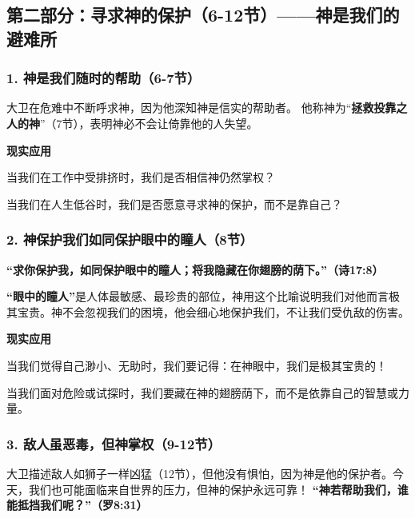\documentclass[a4paper, 12pt]{article}
\begin{document}
\subsection*{第二部分：寻求神的保护（6-12节）——神是我们的避难所  }

\subsubsection*{1. 神是我们随时的帮助（6-7节）  }
\hspace{0.6cm}大卫在危难中不断呼求神，因为他深知神是信实的帮助者。 他称神为“\textbf{拯救投靠之人的神}”（7节），表明神必不会让倚靠他的人失望。

\vspace{0.2cm}


\textbf{现实应用}

\hspace{0.6cm}当我们在工作中受排挤时，我们是否相信神仍然掌权？  

\hspace{0.6cm}当我们在人生低谷时，我们是否愿意寻求神的保护，而不是靠自己？  

\subsubsection*{2. 神保护我们如同保护眼中的瞳人（8节）}
  
\textbf{“求你保护我，如同保护眼中的瞳人；将我隐藏在你翅膀的荫下。”（诗17:8）}

\textbf{“眼中的瞳人”}是人体最敏感、最珍贵的部位，神用这个比喻说明我们对他而言极其宝贵。神不会忽视我们的困境，他会细心地保护我们，不让我们受仇敌的伤害。  
\vspace{0.2cm}

\textbf{现实应用}

\hspace{0.6cm}当我们觉得自己渺小、无助时，我们要记得：在神眼中，我们是极其宝贵的！

\hspace{0.6cm}当我们面对危险或试探时，我们要藏在神的翅膀荫下，而不是依靠自己的智慧或力量。  

\subsubsection*{3. 敌人虽恶毒，但神掌权（9-12节）  }
\hspace{0.6cm}大卫描述敌人如狮子一样凶猛（12节），但他没有惧怕，因为神是他的保护者。今天，我们也可能面临来自世界的压力，但神的保护永远可靠！ \textbf{“神若帮助我们，谁能抵挡我们呢？”（罗8:31）}  
\end{document}
